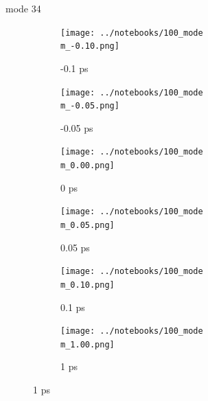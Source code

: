 \documentclass{beamer}
\newcommand\w{0.32}
\begin{document}
\renewcommand\m{34}
\begin{frame}{mode \m}
	\begin{figure}
		\centering
		\begin{subfigure}[b]{\w\textwidth}
			\centering
			\texttt{[image: ../notebooks/100\_mode\\m\_-0.10.png]}
			\caption{-0.1 ps}
		\end{subfigure}
		\begin{subfigure}[b]{\w\textwidth}
			\centering
			\texttt{[image: ../notebooks/100\_mode\\m\_-0.05.png]}
			\caption{-0.05 ps}
		\end{subfigure}
		\begin{subfigure}[b]{\w\textwidth}
			\centering
			\texttt{[image: ../notebooks/100\_mode\\m\_0.00.png]}
			\caption{0 ps}
		\end{subfigure}
		\begin{subfigure}[b]{\w\textwidth}
			\centering
			\texttt{[image: ../notebooks/100\_mode\\m\_0.05.png]}
			\caption{0.05 ps}
		\end{subfigure}
		\begin{subfigure}[b]{\w\textwidth}
			\centering
			\texttt{[image: ../notebooks/100\_mode\\m\_0.10.png]}
			\caption{0.1 ps}
		\end{subfigure}
		\begin{subfigure}[b]{\w\textwidth}
			\centering
			\texttt{[image: ../notebooks/100\_mode\\m\_1.00.png]}
			\caption{1 ps}
		\end{subfigure}
	\end{figure}
\end{frame}
\end{document}
